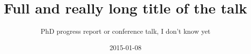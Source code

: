 %
%


\usepackage{graphicx}          %
\usepackage{hyperref}          %
\usepackage{pgf}               %
\usepackage{fancybox}          %
\usepackage{pgfpages}
\usepackage{amsfonts}          %
\usepackage{pifont}            %
\newcommand{\cmark}{\ding{51}}%
\newcommand{\xmark}{\ding{55}}%

\graphicspath{ {./img/} }



\title[Short title of the talk]
      {Full and really long title of the talk}

\subtitle{PhD progress report or conference talk, I don't know yet}

\date[Nanometa-2015]{2015-01-08}





